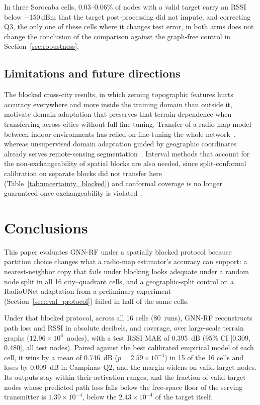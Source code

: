 \documentclass{ieeeaccess}
\begin{document}
In three Sorocaba cells, 0.03--0.06\% of nodes with a valid target carry an RSSI below $-$150\,dBm that the target post-processing did not impute, and correcting Q3, the only one of these cells where it changes test error, in both arms does not change the conclusion of the comparison against the graph-free control in Section~\ref{sec:robustness}.

\subsection{Limitations and future directions}

The blocked cross-city results, in which zeroing topographic features hurts accuracy everywhere and more inside the training domain than outside it, motivate domain adaptation that preserves that terrain dependence when transferring across cities without full fine-tuning. Transfer of a radio-map model between indoor environments has relied on fine-tuning the whole network~\cite{jaiswal2026data}, whereas unsupervised domain adaptation guided by geographic coordinates already serves remote-sensing segmentation~\cite{marsocci2023geomultitasknet}. Interval methods that account for the non-exchangeability of spatial blocks are also needed, since split-conformal calibration on separate blocks did not transfer here (Table~\ref{tab:uncertainty_blocked}) and conformal coverage is no longer guaranteed once exchangeability is violated~\cite{zargarbashi2023conformal}.


\section{Conclusions}
\label{sec:conclusions}

This paper evaluates GNN-RF under a spatially blocked protocol because partition choice changes what a radio-map estimator's accuracy can support: a nearest-neighbor copy that fails under blocking looks adequate under a random node split in all 16 city--quadrant cells, and a geographic-split control on a RadioUNet adaptation from a preliminary experiment (Section~\ref{sec:eval_protocol}) failed in half of the same cells.

Under that blocked protocol, across all 16 cells (80~runs), GNN-RF reconstructs path loss and RSSI in absolute decibels, and coverage, over large-scale terrain graphs ($12.96 \times 10^6$~nodes), with a test RSSI MAE of \SI{0.395}{\deci\bel} (95\% CI [\num{0.309}, \num{0.480}], all test nodes). Paired against the best calibrated empirical model of each cell, it wins by a mean of \SI{0.746}{\deci\bel} ($p{=}2.59\times10^{-4}$) in 15 of the 16 cells and loses by \SI{0.009}{\deci\bel} in Campinas~Q2, and the margin widens on valid-target nodes. Its outputs stay within their activation ranges, and the fraction of valid-target nodes whose predicted path loss falls below the free-space floor of the serving transmitter is $1.39\times10^{-4}$, below the $2.43\times10^{-4}$ of the target itself.
\end{document}
